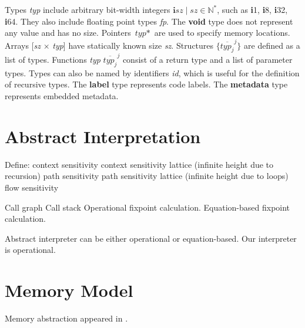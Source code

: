 \documentclass[a4paper]{book}
\begin{document}
Types \textit{typ} include arbitrary bit-width integers
$\textbf{i}\textit{sz} \mid \textit{sz} \in \mathbb{N}^*$, such as
\textbf{i}1, \textbf{i}8, \textbf{i}32, \textbf{i}64.  They also
include floating point types \textit{fp}.  The \textbf{void} type does
not represent any value and has no size.  Pointers $\textit{typ}*$ are
used to specify memory locations.  Arrays [\textit{sz} $\times$
  \textit{typ}] have statically known size \textit{sz}.  Structures
$\big\{\overline{\textit{typ}_j}^j\big\}$ are defined as a list of
types.  Functions \textit{typ} $\overline{\textit{typ}_j}^j$ consist
of a return type and a list of parameter types.  Types can also be
named by identifiers \textit{id}, which is useful for the definition
of recursive types.  The \textbf{label} type represents code labels.
The \textbf{metadata} type represents embedded metadata.

\chapter{Abstract Interpretation}

Define:
context sensitivity
context sensitivity lattice (infinite height due to recursion)
path sensitivity
path sensitivity lattice (infinite height due to loops)
flow sensitivity

Call graph
Call stack
Operational fixpoint calculation.
Equation-based fixpoint calculation.

Abstract interpreter can be either operational or equation-based.  Our
interpreter is operational.

\chapter{Memory Model}
Memory abstraction appeared in \cite{M06}.
\end{document}
